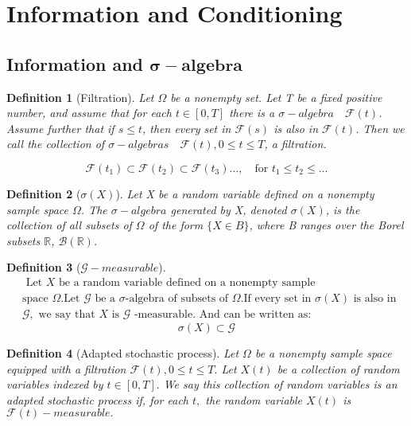 \documentclass[a4]{article}
\newtheorem{definition}{Definition}
\begin{document}
\section{Information and Conditioning}
\subsection{Information and $\boldsymbol{\sigma-algebra}$}
\begin{definition}[Filtration]
	\quad \par
	\bigbreak 
	Let $\Omega$ be a nonempty set. Let T be a fixed positive number, and assume that for each $t\in[0,T]$ there is a $\sigma-algebra\quad \mathcal{F}(t)$. Assume further that if $s\leq t$, then every set in $\mathcal{F}(s)$ is also in $\mathcal{F}(t)$. Then we call the collection of $\sigma-algebras\quad \mathcal{F}(t),0\leq t\leq T$, a filtration.\par 
	$$
	\mathcal{F}(t_{1})\subset 	\mathcal{F}(t_{2})\subset 	\mathcal{F}(t_{3})...,\quad \text{for }t_{1}\leq t_{2}\leq ...
	$$
\end{definition}
\begin{definition}[$\sigma(X)$]
	\quad \par \bigbreak
	Let X be a random variable defined on a nonempty sample space $\Omega$. The $\sigma-algebra$ generated by X, denoted $\sigma(X)$, is the collection of all subsets of $\Omega$ of the form $\{X\in B\}$, where B ranges over the Borel subsets $\mathbb
	R$, $\mathcal{B}(\mathbb{R})$.
\end{definition}
\begin{definition}[$\mathcal{G}-measurable$]
$$
	\begin{aligned}
&\text { Let } X \text { be a random variable defined on a nonempty sample}\\
&\text {space } \Omega . \text {Let } \mathcal{G} \text { be a } \sigma \text {-algebra of subsets of } \Omega . \text {If every set in } \sigma(X) \text { is also in }\\
&\mathcal{G}, \text { we say that } X \text { is } \mathcal{G} \text { -measurable. And can be written as:}
\end{aligned}
$$
$$
\sigma(X)\subset \mathcal{G}
$$
\end{definition}
\begin{definition}[Adapted stochastic process]
	\quad \par 
	\bigbreak 
\noindent Let $\Omega$ be a nonempty sample space equipped with a filtration $\mathcal{F}(t), 0 \leq t \leq T .$ Let $X(t)$ be a collection of random variables indexed by
	$t \in[0, T] .$ We say this collection of random variables is an adapted stochastic process if, for each $t,$ the random variable $X(t)$ is $\mathcal{F}(t)-m e a s u r a b l e .$
\end{definition}
\end{document}
